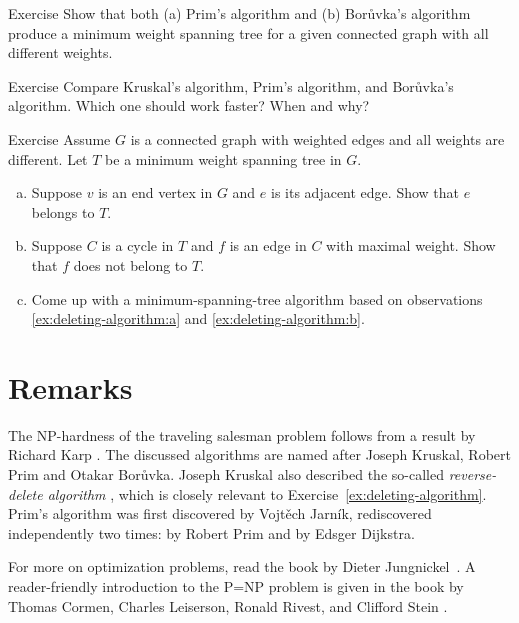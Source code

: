 \begin{thm}{Exercise}\label{ex:PB}
Show that both (a) Prim's algorithm and (b) Borůvka's algorithm produce a minimum weight spanning tree for a given connected graph with all different weights.
\end{thm}

\begin{thm}{Exercise}\label{ex:KPB}
Compare Kruskal’s algorithm, Prim's algorithm, and Borůvka's algorithm.
Which one should work faster?
When and why?
\end{thm}

\begin{thm}{Exercise}\label{ex:deleting-algorithm}
Assume $G$ is a connected graph with weighted edges and all weights are different.
Let $T$ be a minimum weight spanning tree in $G$.
\begin{enumerate}[(a)]
\item\label{ex:deleting-algorithm:a} Suppose $v$ is an end vertex in $G$ and $e$ is its adjacent edge.
Show that $e$ belongs to $T$.
\item\label{ex:deleting-algorithm:b} Suppose $C$ is a cycle in $T$ and $f$ is an edge in $C$ with maximal weight.
Show that $f$ does not belong to $T$.
\item\label{ex:deleting-algorithm:c}
Come up with a minimum-spanning-tree algorithm based on observations \ref{ex:deleting-algorithm:a} and \ref{ex:deleting-algorithm:b}.
\end{enumerate}
\end{thm}

\section{Remarks}

The NP-hardness of the traveling salesman problem follows from a result by Richard Karp \cite{karp}.
The discussed algorithms are named after Joseph Kruskal, Robert Prim and Otakar Borůvka.
Joseph Kruskal also described the so-called \emph{reverse-delete algorithm} \cite{kruskal}, which is closely relevant to Exercise~\ref{ex:deleting-algorithm}.
Prim's algorithm was first discovered by Vojtěch Jarník,
rediscovered  independently two times: by Robert Prim and by Edsger Dijkstra.

For more on optimization problems, read the book by Dieter Jungnickel~\cite{jungnickel}.
A reader-friendly introduction to the P=NP problem is given in the book by 
Thomas Cormen,
Charles Leiserson,
Ronald Rivest, and
Clifford Stein \cite[Chapter 34]{cormen-leiserson-rivest-stein}.


